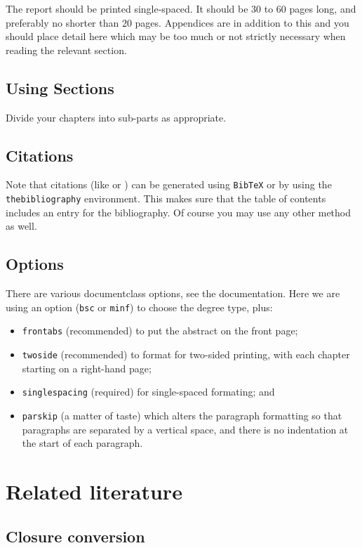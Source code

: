 \documentclass[bsc,frontabs,twoside,singlespacing,parskip,deptreport]{infthesis}
\theoremstyle{definition}
\begin{document}
The report should be printed single-spaced.
It should be 30 to 60 pages long, and preferably no shorter than 20 pages.
Appendices are in addition to this and you should place detail
here which may be too much or not strictly necessary when reading the relevant section.

\section{Using Sections}

Divide your chapters into sub-parts as appropriate.

\section{Citations}

Note that citations
(like \cite{P1} or \cite{P2})
can be generated using {\tt BibTeX} or by using the
{\tt thebibliography} environment. This makes sure that the
table of contents includes an entry for the bibliography.
Of course you may use any other method as well.

\section{Options}

There are various documentclass options, see the documentation.  Here we are
using an option ({\tt bsc} or {\tt minf}) to choose the degree type, plus:
\begin{itemize}
\item {\tt frontabs} (recommended) to put the abstract on the front page;
\item {\tt twoside} (recommended) to format for two-sided printing, with
  each chapter starting on a right-hand page;
\item {\tt singlespacing} (required) for single-spaced formating; and
\item {\tt parskip} (a matter of taste) which alters the paragraph formatting so that
paragraphs are separated by a vertical space, and there is no
indentation at the start of each paragraph.
\end{itemize}






\chapter{Related literature}
\section{Closure conversion}
\end{document}
